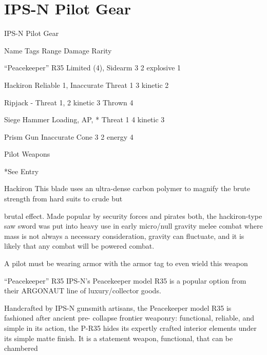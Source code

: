 \section{IPS-N Pilot Gear}

                                                IPS-N Pilot Gear  

  Name                     Tags                                      Range            Damage                   Rarity 

  “Peacekeeper” R35        Limited (4), Sidearm                      3                2 explosive              1 

 Hackiron                  Reliable 1, Inaccurate                   Threat 1          3 kinetic                2 

 Ripjack                   -                                        Threat 1,         2 kinetic                3 
                                                                    Thrown 4 

 Siege Hammer              Loading, AP, *                           Threat 1          4 kinetic                3 

 Prism Gun                 Inaccurate                                Cone 3           2 energy                 4 

                                                     Pilot Weapons  

*See Entry
 

Hackiron  
This blade uses an ultra-dense carbon polymer to magnify the brute strength from hard suits to crude but  

brutal effect. Made popular by security forces and pirates both, the hackiron-type saw sword was put into  
heavy use in early micro/null gravity melee combat where mass is not always a necessary consideration,  
gravity can fluctuate, and it is likely that any combat will be powered combat.  

A pilot must be wearing armor with the armor tag to even wield this weapon  

“Peacekeeper” R35  
IPS-N’s Peacekeeper model R35 is a popular option from their ARGONAUT line of luxury/collector goods.  

Handcrafted by IPS-N gunsmith artisans, the Peacekeeper model R35 is fashioned after ancient pre- 
collapse frontier weaponry: functional, reliable, and simple in its action, the P-R35 hides its expertly crafted  
interior elements under its simple matte finish. It is a statement weapon, functional, that can be chambered  

